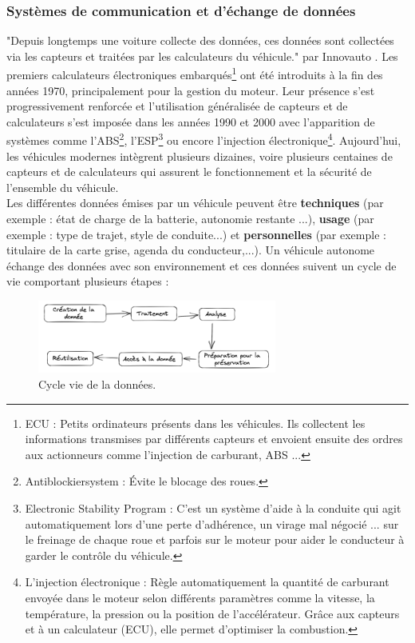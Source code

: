 \subsubsection{Systèmes de communication et d’échange de données}
"Depuis longtemps une voiture collecte des données, ces données sont collectées via les capteurs et traitées par les calculateurs du véhicule." par Innovauto \cite{donnees_echange}. Les premiers calculateurs électroniques embarqués\footnote{ECU : Petits ordinateurs présents dans les véhicules. Ils collectent les informations transmises par différents capteurs et envoient ensuite des ordres aux actionneurs comme l'injection de carburant, ABS ...} ont été introduits à la fin des années 1970, principalement pour la gestion du moteur. Leur présence s’est progressivement renforcée et l’utilisation généralisée de capteurs et de calculateurs s’est imposée dans les années 1990 et 2000 avec l’apparition de systèmes comme l’ABS\footnote{Antiblockiersystem : Évite le blocage des roues.}, l’ESP\footnote{Electronic Stability Program : C'est un système d’aide à la conduite qui agit automatiquement lors d'une perte d’adhérence, un virage mal négocié ... sur le freinage de chaque roue et parfois sur le moteur pour aider le conducteur à garder le contrôle du véhicule.} ou encore l’injection électronique\footnote{L’injection électronique : Règle automatiquement la quantité de carburant envoyée dans le moteur selon différents paramètres comme la vitesse, la température, la pression ou la position de l’accélérateur. Grâce aux capteurs et à un calculateur (ECU), elle permet d’optimiser la combustion.}. Aujourd’hui, les véhicules modernes intègrent plusieurs dizaines, voire plusieurs centaines de capteurs et de calculateurs qui assurent le fonctionnement et la sécurité de l’ensemble du véhicule. \\
Les différentes données émises par un véhicule peuvent être \textbf{techniques} (par exemple : état de charge de la batterie, autonomie restante ...), \textbf{usage} (par exemple : type de trajet, style de conduite...) et \textbf{personnelles} (par exemple : titulaire de la carte grise, agenda du conducteur,...).
Un véhicule autonome échange des données avec son environnement et ces données suivent un cycle de vie comportant plusieurs étapes :
\begin{figure}[H]
    \centering
    \includegraphics[width=0.7\textwidth]{images/schéma_cycle_vie_donneées.png} 
    \caption{Cycle vie de la données.}
\end{figure}
\vspace{0.5cm}

